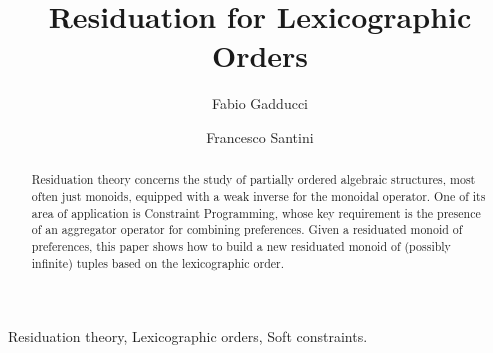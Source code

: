 \documentclass[a4paper]{elsarticle}
\newcommand{\1}{\mathbf{1}}
\begin{document}
\begin{frontmatter}





\title{Residuation for Lexicographic Orders}


		\author[pisa]{Fabio Gadducci}
		\author[perugia]{Francesco Santini}
		
		\address[pisa]{Dipartimento di Informatica, Universit{\`a} degli Studi di Pisa, Italy}	
		\address[perugia]{Dipartimento di Matematica e Informatica, Universit{\`a} degli Studi di Perugia, Italy}	



\begin{abstract} 
	Residuation theory concerns the study of partially ordered algebraic structures, most often just monoids,
	equipped with a weak inverse for the monoidal operator.
	One of its area of application is Constraint Programming, whose 
	key requirement is the presence of an aggregator operator for combining preferences.
	Given a residuated monoid of preferences, this paper shows how to build a new residuated monoid 
	of (possibly infinite) tuples based on the lexicographic order. 
\end{abstract}
        \begin{keyword}
        	Residuation theory, Lexicographic orders, Soft constraints. %
        \end{keyword}
    \end{frontmatter}
\end{document}
